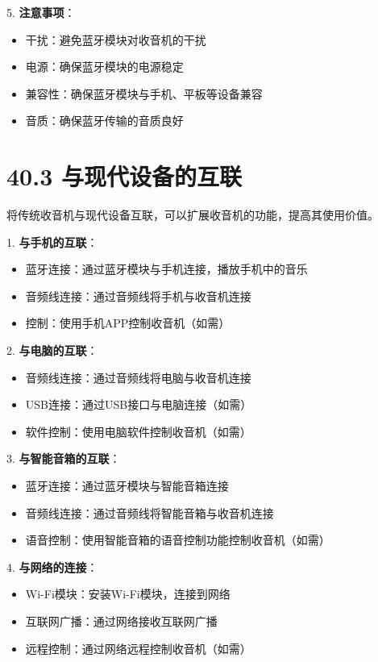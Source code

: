 \documentclass[12pt,UTF8]{ctexbook}
\begin{document}
5. \textbf{注意事项}：
   \begin{itemize}[leftmargin=3.5em]
   \item 干扰：避免蓝牙模块对收音机的干扰
   \item 电源：确保蓝牙模块的电源稳定
   \item 兼容性：确保蓝牙模块与手机、平板等设备兼容
   \item 音质：确保蓝牙传输的音质良好
   \end{itemize}

\section*{40.3 与现代设备的互联}

将传统收音机与现代设备互联，可以扩展收音机的功能，提高其使用价值。

1. \textbf{与手机的互联}：
   \begin{itemize}[leftmargin=3.5em]
   \item 蓝牙连接：通过蓝牙模块与手机连接，播放手机中的音乐
   \item 音频线连接：通过音频线将手机与收音机连接
   \item 控制：使用手机APP控制收音机（如需）
   \end{itemize}

2. \textbf{与电脑的互联}：
   \begin{itemize}[leftmargin=3.5em]
   \item 音频线连接：通过音频线将电脑与收音机连接
   \item USB连接：通过USB接口与电脑连接（如需）
   \item 软件控制：使用电脑软件控制收音机（如需）
   \end{itemize}

3. \textbf{与智能音箱的互联}：
   \begin{itemize}[leftmargin=3.5em]
   \item 蓝牙连接：通过蓝牙模块与智能音箱连接
   \item 音频线连接：通过音频线将智能音箱与收音机连接
   \item 语音控制：使用智能音箱的语音控制功能控制收音机（如需）
   \end{itemize}

4. \textbf{与网络的连接}：
   \begin{itemize}[leftmargin=3.5em]
   \item Wi-Fi模块：安装Wi-Fi模块，连接到网络
   \item 互联网广播：通过网络接收互联网广播
   \item 远程控制：通过网络远程控制收音机（如需）
   \end{itemize}
\end{document}
